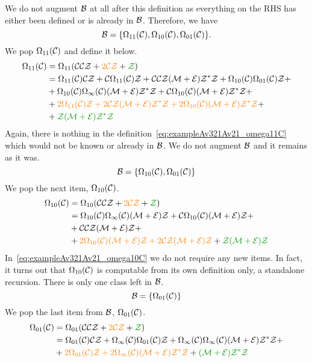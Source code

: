 \documentclass[12pt, a4paper, twoside]{report}
\begin{document}
We do not augment $\mathcal{B}$ at all after this definition as everything on the RHS has either been defined or is already in $\mathcal{B}$. Therefore, we have
$$\mathcal{B} = \{\Omega_{11}(\mathcal{C}),\Omega_{10}(\mathcal{C}), \Omega_{01}(\mathcal{C})\}.$$
We pop $\Omega_{11}(\mathcal{C})$ and define it below.
\begin{align}
  \begin{aligned}
    \Omega_{11}(\C) &= \Omega_{11}(\C\C\Z + \textcolor{orange}{2\C\Z} + \textcolor{green}{\Z})\\
    &= \Omega_{11}(\C)\C\Z + \C\Omega_{11}(\C)\Z + \C\C\Z(\M+\EE)\Z^*\Z + \Omega_{10}(\C)\Omega_{01}(\C)\Z +\\
    &+ \Omega_{10}(\C)\Omega_\infty(\C)(\M+\EE)\Z^*\Z + \C\Omega_{10}(\C)(\M+\EE)\Z^*\Z +\\
    &+ \textcolor{orange}{2\Omega_{11}(\C)\Z + 2\C\Z(\M+\EE)\Z^*\Z + 2\Omega_{10}(\C)(\M+\EE)\Z^*\Z} +\\
    &+\textcolor{green}{\Z(\M+\EE)\Z^*\Z}\\
  \end{aligned}
  \label{eq:exampleAv321Av21_omega11C}
\end{align}
Again, there is nothing in the definition~\eqref{eq:exampleAv321Av21_omega11C} which would not be known or already in $\mathcal{B}$. We do not augment $\mathcal{B}$ and it remains as it was.
$$\mathcal{B} = \{\Omega_{10}(\mathcal{C}), \Omega_{01}(\mathcal{C})\}$$
We pop the next item, $\Omega_{10}(\mathcal{C})$.
\begin{align}
  \begin{aligned}
    \Omega_{10}(\C) &= \Omega_{10}(\C\C\Z + \textcolor{orange}{2\C\Z} + \textcolor{green}{\Z})\\
    &= \Omega_{10}(\C)\Omega_\infty(\C)(\M+\EE)\Z + \C\Omega_{10}(\C)(\M+\EE)\Z +\\
    &+ \C\C\Z(\M+\EE)\Z +\\
    &+ \textcolor{orange}{2\Omega_{10}(\C)(\M+\EE)\Z + 2\C\Z(\M+\EE)\Z} + \textcolor{green}{\Z(\M+\EE)\Z}
  \end{aligned}
  \label{eq:exampleAv321Av21_omega10C}
\end{align}
In~\eqref{eq:exampleAv321Av21_omega10C} we do not require any new items. In fact, it turns out that $\Omega_{10}(\mathcal{C})$ is computable from its own definition only, a standalone recursion. There is only one class left in $\mathcal{B}$.
$$\mathcal{B} = \{\Omega_{01}(\mathcal{C})\}$$
We pop the last item from $\mathcal{B}$, $\Omega_{01}(\mathcal{C})$.
\begin{align}
  \begin{aligned}
    \Omega_{01}(\C) &= \Omega_{01}(\C\C\Z + \textcolor{orange}{2\C\Z} + \textcolor{green}{\Z})\\
    &= \Omega_{01}(\C)\C\Z + \Omega_\infty(\C)\Omega_{01}(\C)\Z + \Omega_\infty(\C)\Omega_\infty(\C)(\M+\EE)\Z^*\Z +\\
    &+ \textcolor{orange}{2\Omega_{01}(\C)\Z + 2\Omega_\infty(\C)(\M+\EE)\Z^*\Z} + \textcolor{green}{(\M+\EE)\Z^*\Z}
  \end{aligned}
  \label{eq:exampleAv321Av21_omega01C}
\end{align}
\end{document}
